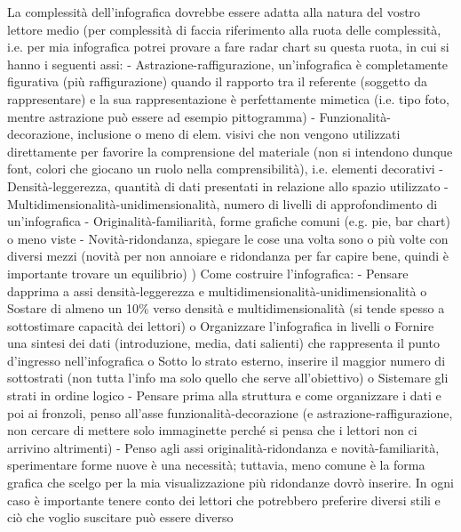 La complessità dell'infografica dovrebbe essere adatta alla natura del vostro lettore medio (per complessità di faccia riferimento alla ruota delle complessità, i.e. per mia infografica potrei provare a fare radar chart su questa ruota, in cui si hanno i seguenti assi:
-	Astrazione-raffigurazione, un'infografica è completamente figurativa (più raffigurazione) quando il rapporto tra il referente (soggetto da rappresentare) e la sua rappresentazione è perfettamente mimetica (i.e. tipo foto, mentre astrazione può essere ad esempio pittogramma)
-	Funzionalità-decorazione, inclusione o meno di elem. visivi che non vengono utilizzati direttamente per favorire la comprensione del materiale (non si intendono dunque font, colori che giocano un ruolo nella comprensibilità), i.e. elementi decorativi
-	Densità-leggerezza, quantità di dati presentati in relazione allo spazio utilizzato
-	Multidimensionalità-unidimensionalità, numero di livelli di approfondimento di un'infografica
-	Originalità-familiarità, forme grafiche comuni (e.g. pie, bar chart) o meno viste
-	Novità-ridondanza, spiegare le cose una volta sono o più volte con diversi mezzi (novità per non annoiare e ridondanza per far capire bene, quindi è importante trovare un equilibrio)
)
Come costruire l'infografica:
-	Pensare dapprima a assi densità-leggerezza e multidimensionalità-unidimensionalità
    o	Sostare di almeno un 10\% verso densità e multidimensionalità (si tende spesso a sottostimare capacità dei lettori)
    o	Organizzare l'infografica in livelli
    o	Fornire una sintesi dei dati (introduzione, media, dati salienti) che rappresenta il punto d'ingresso nell'infografica
    o	Sotto lo strato esterno, inserire il maggior numero di sottostrati (non tutta l'info ma solo quello che serve all'obiettivo)
    o	Sistemare gli strati in ordine logico
-	Pensare prima alla struttura e come organizzare i dati e poi ai fronzoli, penso all'asse funzionalità-decorazione (e astrazione-raffigurazione, non cercare di mettere solo immaginette perché si pensa che i lettori non ci arrivino altrimenti)
-	Penso agli assi originalità-ridondanza e novità-familiarità, sperimentare forme nuove è una necessità; tuttavia, meno comune è la forma grafica che scelgo per la mia visualizzazione più ridondanze dovrò inserire. In ogni caso è importante tenere conto dei lettori che potrebbero preferire diversi stili e ciò che voglio suscitare può essere diverso

